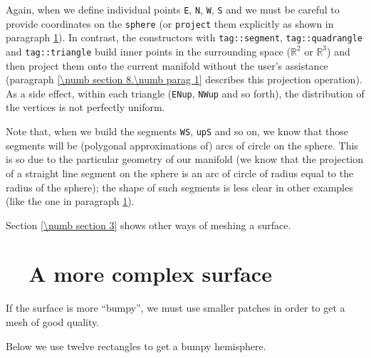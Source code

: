 Again, when we define individual points {\small\tt\azul E}, {\small\tt\azul N}, {\small\tt\azul W},
{\small\tt\azul S} and {\small\tt{}} we must be careful to provide coordinates on the
{\small\tt sphere} (or {\small\tt project} them explicitly as shown in paragraph
\ref{\numb section 2.\numb parag 7}).
In contrast, the {\small\tt{}} constructors with {\small\tt\textcolor{tag}{tag}::segment},
{\small\tt\textcolor{tag}{tag}::quadrangle} and {\small\tt\textcolor{tag}{tag}::triangle}
build inner points in the surrounding space ($ \mathbb{R}^2 $ or $ \mathbb{R}^3 $) and
then project them onto the current manifold without the user's assistance (paragraph
\ref{\numb section 8.\numb parag 1} describes this projection operation).
As a side effect, within each triangle ({\small\tt ENup}, {\small\tt NWup} and so forth),
the distribution of the vertices is not perfectly uniform.

Note that, when we build the segments {\small\tt WS}, {\small\tt upS} and so on,
we know that those segments will be (polygonal approximations of) arcs of circle on the sphere.
This is so due to the particular geometry of our manifold (we know that the projection of
a straight line segment on the sphere is an arc of circle of radius equal to the radius of
the sphere); the shape of such segments is less clear in other examples
(like the one in paragraph \ref{\numb section 2.\numb parag 7}).

Section \ref{\numb section 3} shows other ways of meshing a surface.


\section{~~A more complex surface}\label{\numb section 2.\numb parag 7}

If the surface is more ``bumpy'',
we must use smaller patches in order to get a mesh of good quality.

Below we use twelve rectangles to get a bumpy hemisphere.

